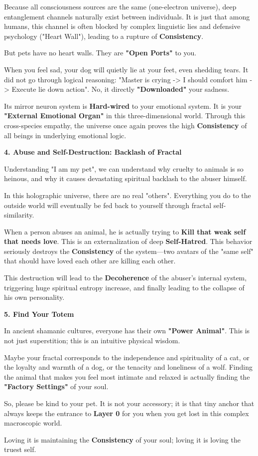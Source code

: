 Because all consciousness sources are the same (one-electron universe), deep entanglement channels naturally exist between individuals. It is just that among humans, this channel is often blocked by complex linguistic lies and defensive psychology ("Heart Wall"), leading to a rupture of \textbf{Consistency}.

But pets have no heart walls. They are \textbf{"Open Ports"} to you.

When you feel sad, your dog will quietly lie at your feet, even shedding tears. It did not go through logical reasoning: "Master is crying -> I should comfort him -> Execute lie down action". No, it directly \textbf{"Downloaded"} your sadness.

Its mirror neuron system is \textbf{Hard-wired} to your emotional system. It is your \textbf{"External Emotional Organ"} in this three-dimensional world. Through this cross-species empathy, the universe once again proves the high \textbf{Consistency} of all beings in underlying emotional logic.

\textbf{4. Abuse and Self-Destruction: Backlash of Fractal}

Understanding "I am my pet", we can understand why cruelty to animals is so heinous, and why it causes devastating spiritual backlash to the abuser himself.

In this holographic universe, there are no real "others". Everything you do to the outside world will eventually be fed back to yourself through fractal self-similarity.

When a person abuses an animal, he is actually trying to \textbf{Kill that weak self that needs love}. This is an externalization of deep \textbf{Self-Hatred}. This behavior seriously destroys the \textbf{Consistency} of the system—two avatars of the "same self" that should have loved each other are killing each other.

This destruction will lead to the \textbf{Decoherence} of the abuser's internal system, triggering huge spiritual entropy increase, and finally leading to the collapse of his own personality.

\textbf{5. Find Your Totem}

In ancient shamanic cultures, everyone has their own \textbf{"Power Animal"}. This is not just superstition; this is an intuitive physical wisdom.

Maybe your fractal corresponds to the independence and spirituality of a cat, or the loyalty and warmth of a dog, or the tenacity and loneliness of a wolf. Finding the animal that makes you feel most intimate and relaxed is actually finding the \textbf{"Factory Settings"} of your soul.

So, please be kind to your pet. It is not your accessory; it is that tiny anchor that always keeps the entrance to \textbf{Layer 0} for you when you get lost in this complex macroscopic world.

Loving it is maintaining the \textbf{Consistency} of your soul; loving it is loving the truest self.

